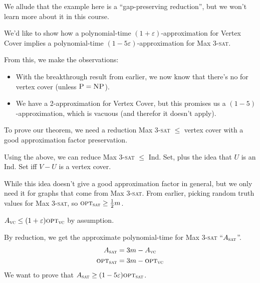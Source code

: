                     We allude that the example here is a ``gap-preserving reduction'', but we won't learn more about it in this course.

                    We'd like to show how a polynomial-time $(1 + \varepsilon)$-approximation for Vertex Cover implies a polynomial-time $(1 - 5 \varepsilon)$-approximation for Max 3-\textsc{sat}.

                    From this, we make the observations:
                    \begin{itemize}
                        \item With the breakthrough result from earlier, we now know that there's no \ptas for vertex cover (unless $\textsc{P} = \textsc{NP}$).
                        \item We have a 2-approximation for Vertex Cover, but this promises us a $(1-5)$-approximation, which is vacuous (and therefor it doesn't apply).
                    \end{itemize}

                    To prove our theorem, we need a reduction Max 3-\textsc{sat} $\le$ vertex cover with a good approximation factor preservation.

                    Using the above, we can reduce Max 3-\textsc{sat} $\le$ Ind. Set, plus the idea that $U$ is an Ind. Set iff $V-U$ is a vertex cover.

                    While this idea doesn't give a good approximation factor in general, but we only need it for graphs that come from Max 3-\textsc{sat}.
                    From earlier, picking random truth values for Max 3-\textsc{sat}, so $\textsc{opt}_{\textsc{sat}} \ge \frac{1}{2}m$.

                    $A_\textsc{vc} \le (1 + \varepsilon) \textsc{opt}_\textsc{vc}$ by assumption.

                    By reduction, we get the approximate polynomial-time for Max 3-\textsc{sat} ``$A_\textsc{sat}$''.
                    \begin{align*}
                        A_\textsc{sat} &= 3m - A_\textsc{vc} \\
                        \textsc{opt}_\textsc{sat} &= 3m - \textsc{opt}_\textsc{vc}
                    \end{align*}
                    We want to prove that $A_\textsc{sat} \ge (1 - 5 \varepsilon) \textsc{opt}_\textsc{sat}$.

